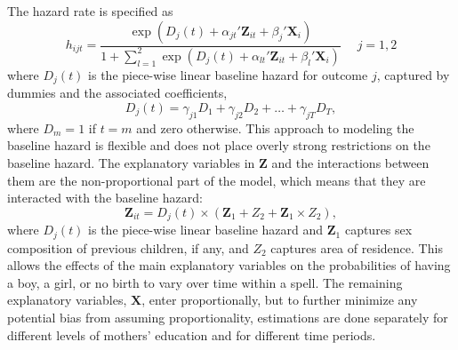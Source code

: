 \documentclass[12pt,letterpaper]{article}
\begin{document}
The hazard rate is specified as
\begin{equation}
 h_{ijt} = \frac{\exp(D_j(t) + \alpha_{jt}'\mathbf{Z}_{it} + \beta_j'\mathbf{X}_{i})} 
 {1 + \sum_{l=1}^2 \exp(D_j(t) + \alpha_{lt}'\mathbf{Z}_{it} + \beta_l'\mathbf{X}_{i})} \: \: \; \; \;  j = 1,2
 \label{eq:hazard}
\end{equation}
where $D_{j}(t)$ is the piece-wise linear baseline hazard for outcome $j$, captured
by dummies and the associated coefficients,
\begin{equation}
D_j(t) = \gamma_{j1} D_1 + \gamma_{j2} D_2 + \ldots + \gamma_{jT} D_T,
\end{equation}
where $D_m = 1$ if $t=m$ and zero otherwise.
This approach to modeling the baseline hazard is flexible and does not place 
overly strong restrictions on the baseline hazard.
The explanatory variables in $\mathbf{Z}$ and the interactions between them 
are the non-proportional part of the model, which means that they are
interacted with the baseline hazard:
\begin{equation}
 \mathbf{Z}_{it} = D_j(t) \times (\mathbf{Z}_1 + Z_2 + \mathbf{Z}_1 \times Z_2),
\end{equation}
where $D_j(t)$ is the piece-wise linear baseline hazard and $\mathbf{Z}_1$ captures sex 
composition of previous children, if any, and $Z_2$ captures area of residence.
This allows the effects of the main explanatory variables on the probabilities 
of having a boy, a girl, or no birth to vary over time within a spell.
The remaining explanatory variables, $\mathbf{X}$, enter proportionally,
but to further minimize any potential bias from assuming proportionality, estimations 
are done separately for different levels of mothers' education and for different 
time periods.
\end{document}
